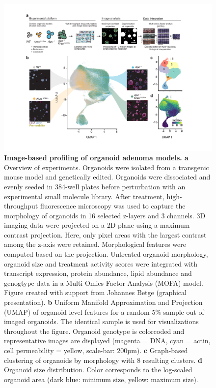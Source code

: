 \begin{flushleft}
\begin{figure}[h!]
\centering
\includegraphics[width=\textwidth,
                height=\textheight,
                keepaspectratio]{figures/adenomaprofiling/pdf/fig_1_2.pdf}
\caption{\textbf{Image-based profiling of organoid adenoma models. a} Overview of experiments. Organoids were isolated from a transgenic mouse model and genetically edited. Organoids were dissociated and evenly seeded in 384-well plates before perturbation with an experimental small molecule library. After treatment, high-throughput fluorescence microscopy was used to capture the morphology of organoids in 16 selected z-layers and 3 channels. 3D imaging data were projected on a 2D plane using a maximum contrast projection. Here, only pixel areas with the largest contrast among the z-axis were retained. Morphological features were computed based on the projection. Untreated organoid morphology, organoid size and treatment activity scores were integrated with transcript expression, protein abundance, lipid abundance and genogtype data in a Multi-Omics Factor Analysis (MOFA) model. Figure created with support from Johannes Betge (graphical presentation). 
\textbf{b} Uniform Manifold Approximation and Projection (UMAP) of organoid-level features for a random 5\% sample out of imaged organoids. The identical sample is used for visualizations throughout the figure. Organoid genotype is colorcoded and representative images are displayed (magenta = DNA, cyan = actin, cell permeability = yellow, scale-bar: 200µm). \textbf{c} Graph-based clustering of organoids by morphology with 8 resulting clusters. \textbf{d} Organoid size distribution. Color corresponds to the log-scaled organoid area (dark blue: minimum size, yellow: maximum size).}
\label{fig_120}
\end{figure}
\bigbreak


\end{flushleft}
